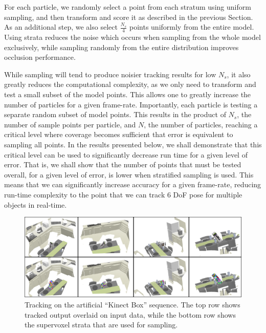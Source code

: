 For each particle, we randomly select a point from each stratum using uniform sampling, and then transform and score it as described in the previous Section. As an additional step, we also select $\frac{N_s}{4}$ points uniformly from the entire model. Using strata reduces the noise which occurs when sampling from the whole model exclusively, while sampling randomly from the entire distribution improves occlusion performance. 

While sampling will tend to produce noisier tracking results for low $N_s$, it also greatly reduces the computational complexity, as we only need to transform and test a small subset of the model points. This allows one to greatly increase the number of particles for a given frame-rate. Importantly, each particle is testing a separate random subset of model points. This results in the product of $N_s$, the number of sample points per particle, and $N$, the number of particles, reaching a critical level where coverage becomes sufficient that error is equivalent to sampling all points. In the results presented below, we shall demonstrate that this critical level can be used to significantly decrease run time for a given level of error. That is, we shall show that the number of points that must be tested overall, for a given level of error, is lower when stratified sampling is used. This means that we can significantly increase accuracy for a given frame-rate, reducing run-time complexity to the point that we can track 6 DoF pose for multiple objects in real-time.   
\begin{figure}[!t]
  \centering
  \includegraphics[width=\linewidth]{figures/Tracking/KinectBoxSVMontage.pdf}
  \caption[Tracking on the artificial ``Kinect Box'' sequence.]{Tracking on the artificial ``Kinect Box'' sequence. The top row shows tracked output overlaid on input data, while the bottom row shows the supervoxel strata that are used for sampling.}
  \label{fig:KinectBoxMontage}
\end{figure}

